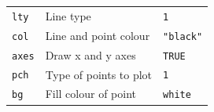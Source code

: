 \documentclass[12pt,a4paper]{book}
\theoremstyle{definition}
\theoremstyle{definition}
\theoremstyle{definition}
\theoremstyle{remark}
\begin{document}
\begin{longtable}[]{@{}lll@{}}
\begin{minipage}[t]{0.15\columnwidth}\raggedright
\texttt{lty}\strut
\end{minipage} & \begin{minipage}[t]{0.32\columnwidth}\raggedright
Line type\strut
\end{minipage} & \begin{minipage}[t]{0.39\columnwidth}\raggedright
\texttt{1}\strut
\end{minipage}\tabularnewline
\begin{minipage}[t]{0.15\columnwidth}\raggedright
\texttt{col}\strut
\end{minipage} & \begin{minipage}[t]{0.32\columnwidth}\raggedright
Line and point colour\strut
\end{minipage} & \begin{minipage}[t]{0.39\columnwidth}\raggedright
\texttt{"black"}\strut
\end{minipage}\tabularnewline
\begin{minipage}[t]{0.15\columnwidth}\raggedright
\texttt{axes}\strut
\end{minipage} & \begin{minipage}[t]{0.32\columnwidth}\raggedright
Draw x and y axes\strut
\end{minipage} & \begin{minipage}[t]{0.39\columnwidth}\raggedright
\texttt{TRUE}\strut
\end{minipage}\tabularnewline
\begin{minipage}[t]{0.15\columnwidth}\raggedright
\texttt{pch}\strut
\end{minipage} & \begin{minipage}[t]{0.32\columnwidth}\raggedright
Type of points to plot\strut
\end{minipage} & \begin{minipage}[t]{0.39\columnwidth}\raggedright
\texttt{1}\strut
\end{minipage}\tabularnewline
\begin{minipage}[t]{0.15\columnwidth}\raggedright
\texttt{bg}\strut
\end{minipage} & \begin{minipage}[t]{0.32\columnwidth}\raggedright
Fill colour of point\strut
\end{minipage} & \begin{minipage}[t]{0.39\columnwidth}\raggedright
\texttt{white}\strut
\end{minipage}\tabularnewline
\bottomrule
\end{longtable}
\end{document}
